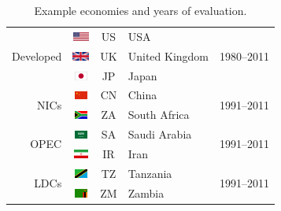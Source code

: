 \documentclass[preprint,authoryear,12pt]{elsarticle}\usepackage[]{graphicx}\usepackage[]{color}
\begin{document}
\begin{table} \caption{Example economies and years of evaluation.} \label{tab:Economy_Examples} 
  \begin{center}
    \begin{tabular}{r c c l l} 
      \toprule
      \multirow{3}{*}{Developed} & \includegraphics[height=0.11in]{flag/flag_US.png} & US & USA & \multirow{3}{*}{1980--2011}\\
                                 & \includegraphics[height=0.11in]{flag/flag_UK.png} & UK & United Kingdom & \\
                                 & \includegraphics[height=0.11in]{flag/flag_JP.png} & JP & Japan          & \\
      \midrule
      \multirow{2}{*}{NICs}      & \includegraphics[height=0.11in]{flag/flag_CN.png} & CN & China & \multirow{2}{*}{1991--2011}        \\
                                 & \includegraphics[height=0.11in]{flag/flag_ZA.png} & ZA & South Africa & \\
      \midrule
      \multirow{2}{*}{OPEC}      & \includegraphics[height=0.11in]{flag/flag_SA.png} & SA & Saudi Arabia & \multirow{2}{*}{1991--2011} \\
                                 & \includegraphics[height=0.11in]{flag/flag_IR.png} & IR & Iran         &  \\
      \midrule
      \multirow{2}{*}{LDCs}      & \includegraphics[height=0.11in]{flag/flag_TZ.png} & TZ & Tanzania & \multirow{2}{*}{1991--2011}     \\
                                 & \includegraphics[height=0.11in]{flag/flag_ZM.png} & ZM & Zambia      & \\
      \bottomrule
    \end{tabular}
  \end{center}
\end{table}
\end{document}
